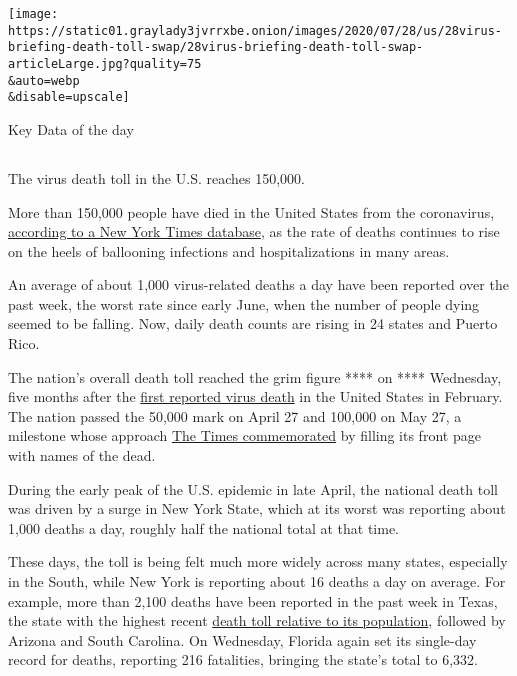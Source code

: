 \texttt{[image: https://static01.graylady3jvrrxbe.onion/images/2020/07/28/us/28virus-briefing-death-toll-swap/28virus-briefing-death-toll-swap-articleLarge.jpg?quality=75\\\&auto=webp\\\&disable=upscale]}

Key Data of the day

\subsection{}

The virus death toll in the U.S. reaches 150,000.

More than 150,000 people have died in the United States from the
coronavirus,
\href{https://www.nytimes3xbfgragh.onion/interactive/2020/us/coronavirus-us-cases.html}{according
to a New York Times database}, as the rate of deaths continues to rise
on the heels of ballooning infections and hospitalizations in many
areas.

An average of about 1,000 virus-related deaths a day have been reported
over the past week, the worst rate since early June, when the number of
people dying seemed to be falling. Now, daily death counts are rising in
24 states and Puerto Rico.

The nation's overall death toll reached the grim figure **** on ****
Wednesday, five months after the
\href{https://www.nytimes3xbfgragh.onion/2020/02/29/us/coronavirus-washington-death.html}{first
reported virus death} in the United States in February. The nation
passed the 50,000 mark on April 27 and 100,000 on May 27, a milestone
whose approach
\href{https://www.nytimes3xbfgragh.onion/interactive/2020/05/24/us/us-coronavirus-deaths-100000.html}{The
Times commemorated} by filling its front page with names of the dead.

During the early peak of the U.S. epidemic in late April, the national
death toll was driven by a surge in New York State, which at its worst
was reporting about 1,000 deaths a day, roughly half the national total
at that time.

These days, the toll is being felt much more widely across many states,
especially in the South, while New York is reporting about 16 deaths a
day on average. For example, more than 2,100 deaths have been reported
in the past week in Texas, the state with the highest recent
\href{https://www.nytimes3xbfgragh.onion/interactive/2020/us/coronavirus-us-cases.html}{death
toll relative to its population}, followed by Arizona and South
Carolina. On Wednesday, Florida again set its single-day record for
deaths, reporting 216 fatalities, bringing the state's total to 6,332.

